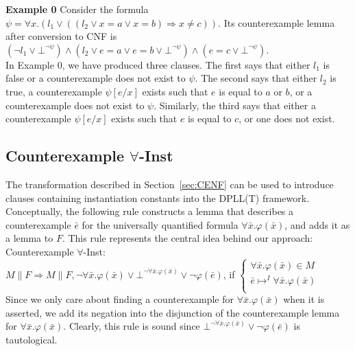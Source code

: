 \documentclass{llncs}
\begin{document}
{\bf Example 0}
Consider the formula $\psi = \forall x. (l_1 \vee (( l_2 \vee x = a \vee x = b ) \Rightarrow x \neq c))$.
Its counterexample lemma after conversion to CNF is $( \neg l_1 \vee \bot^{\neg \psi}) \wedge ( l_2 \vee e = a \vee e = b \vee \bot^{\neg \psi} ) \wedge ( e = c \vee \bot^{\neg \psi})$. \\

In Example 0, we have produced three clauses.
The first says that either $l_1$ is false or a counterexample does not exist to $\psi$.
The second says that either $l_2$ is true, a counterexample $\psi[e/x]$ exists such that $e$ is equal to $a$ or $b$, or a counterexample does not exist to $\psi$. 
Similarly, the third says that either a counterexample $\psi[e/x]$ exists such that $e$ is equal to $c$, or one does not exist.

\subsection{Counterexample $\forall$-Inst}

The transformation described in Section~\ref{sec:CENF} can be used to introduce clauses containing instantiation constants into the DPLL(T) framework.
Conceptually, the following rule constructs a lemma that describes a counterexample $\bar{e}$ for the universally quantified formula $\forall \bar{x}. \varphi( \bar{ x } )$, and adds it as a lemma to $F$.
This rule represents the central idea behind our approach: \\

\noindent Counterexample $\forall$-Inst: \\

$M \parallel F \Longrightarrow M \parallel F, \neg \forall \bar{x}. \varphi( \bar{x} ) \vee \bot^{\neg \forall \bar{x}. \varphi( \bar{x} )} \vee \neg \varphi( \bar{ e } )$, if   
$\begin{cases}
  \forall \bar{x}. \varphi( \bar{ x } ) \in M \\
  \bar{ e } \mapsto^I \forall \bar{x}. \varphi( \bar{ x } ) \\
\end{cases}$ \\

Since we only care about finding a counterexample for $\forall \bar{x}. \varphi( \bar{x} )$ when it is asserted, we add its negation into the disjunction of the counterexample lemma for $\forall \bar{x}. \varphi( \bar{x} )$.
Clearly, this rule is sound since $\bot^{\neg \forall \bar{x}. \varphi( \bar{x} )} \vee \neg \varphi( \bar{ e } )$ is tautological.
\end{document}
